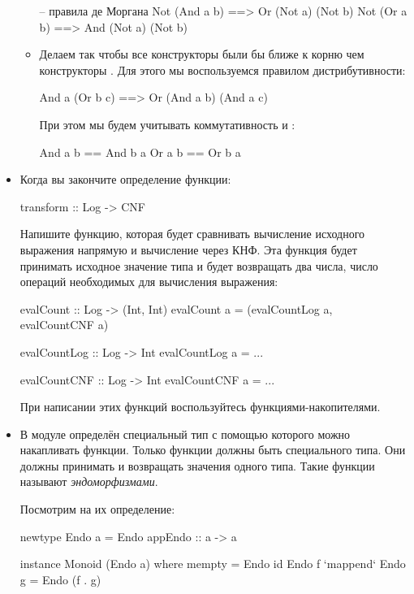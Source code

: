 \begin{itemize}
\begin{itemize}
\begin{code}
    -- правила де Моргана
    Not (And a b) ==> Or  (Not a) (Not b)
    Not (Or  a b) ==> And (Not a) (Not b)
    \end{code}
  \item
    Делаем так чтобы все конструкторы  были бы ближе к корню чем
    конструкторы . Для этого мы воспользуемся правилом
    дистрибутивности:


    \begin{code}
    And a (Or b c)  ==> Or (And a b) (And a c)
    \end{code}

    При этом мы будем учитывать коммутативность  и :


    \begin{code}
    And a b  == And b a
    Or  a b  == Or  b a
    \end{code}
  \end{itemize}
\item
  Когда вы закончите определение функции:


  \begin{code}
  transform :: Log -> CNF
  \end{code}

  Напишите функцию, которая будет сравнивать вычисление исходного
  выражения напрямую и вычисление через КНФ. Эта функция будет принимать
  исходное значение типа  и будет возвращать два числа, число
  операций необходимых для вычисления выражения:


  \begin{code}
  evalCount :: Log -> (Int, Int)
  evalCount a = (evalCountLog a, evalCountCNF a)

  evalCountLog :: Log -> Int
  evalCountLog a = ...

  evalCountCNF :: Log -> Int
  evalCountCNF a = ...
  \end{code}

  При написании этих функций воспользуйтесь функциями-накопителями.
\item
  В модуле  определён специальный тип с помощью которого
  можно накапливать функции. Только функции должны быть специального
  типа. Они должны принимать и возвращать значения одного типа. Такие
  функции называют \emph{эндоморфизмами}.

  Посмотрим на их определение:


  \begin{code}
  newtype Endo a = Endo { appEndo :: a -> a }

  instance Monoid (Endo a) where
          mempty = Endo id
          Endo f `mappend` Endo g = Endo (f . g)
  \end{code}


\end{itemize}
